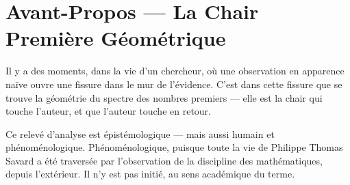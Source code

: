 \documentclass[]{pasj02}
\begin{document}
\begin{abstract}
Ce document expose la \emph{Méthode Spectrale de Philippe Thomas Savard}
--- une approche constructive et formelle de la distribution des nombres
premiers, fondée sur deux suites à somme invariante dites \emph{suites A
et B}.  La méthode repose sur trois piliers interdépendants :
(1)~un \textbf{Formalisme des suites à somme invariante}, dont la propriété
fondamentale est que le rapport entre deux termes consécutifs vaut
rigoureusement $\tfrac{1}{2}$ pour tout choix de positions entières
strictement positives et distinctes ;
(2)~une \textbf{Preuve par l'absurde} établissant l'exclusivité des suites
A et B sur l'ensemble $\mathbb{P}$ des nombres premiers, à l'exclusion
structurelle de tout composé ;
(3)~un \textbf{Pont Savard--Tchebychev--Zêta} qui identifie
constructivement la partie réelle de la droite critique de Riemann
$\operatorname{Re}(\rho)=\tfrac{1}{2}$ au rapport spectral RsP des suites
A et B.

Le résultat central --- $\mathrm{RsP}=\operatorname{Re}(\rho)=\tfrac{1}{2}$
--- est démontré comme un théorème dans le locale formel
\texttt{ensemble\_savard}, vérifié par l'assistant de preuve Isabelle/HOL
à travers deux fichiers de théories : \texttt{methode\_spectral.thy} et
\texttt{methode\_de\_philippot.thy}.  Ce résultat est \emph{universel} :
il est établi pour tout couple $(n_1,n_2)$ d'entiers naturels strictement
positifs et distincts, sans restriction.
\end{abstract}


\section*{Avant-Propos --- La Chair Première Géométrique}

Il y a des moments, dans la vie d'un chercheur, où une observation en
apparence naïve ouvre une fissure dans le mur de l'évidence.  C'est dans
cette fissure que se trouve la géométrie du spectre des nombres premiers ---
elle est la chair qui touche l'auteur, et que l'auteur touche en retour.

Ce relevé d'analyse est épistémologique --- mais aussi humain et
phénoménologique.  Phénoménologique, puisque toute la vie de Philippe
Thomas Savard a été traversée par l'observation de la discipline des
mathématiques, depuis l'extérieur.  Il n'y est pas initié, au sens
académique du terme.
\end{document}
